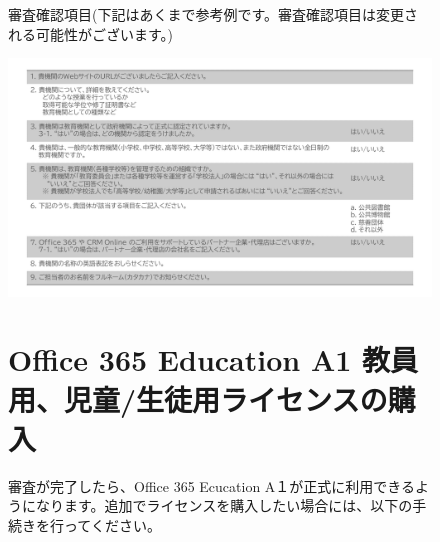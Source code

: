 \begin{figure}[h]
    \begin{minipage}{1.0\textwidth}
        審査確認項目(下記はあくまで参考例です。審査確認項目は変更される可能性がございます。)
    \end{minipage}
\end{figure}


\begin{figure}[h]
    \centering
    \includegraphics[width=17cm]{figures/O365A1_review01.png}
    \vspace{5cm}
\end{figure}

\begin{figure}[h]
    \begin{minipage}{1.0\textwidth}
        \section{Office 365 Education A1 教員用、児童/生徒用ライセンスの購入}
        \label{sec:Office365ライセンス購入}
        審査が完了したら、Office 365 Ecucation A１が正式に利用できるようになります。追加でライセンスを購入したい場合には、以下の手続きを行ってください。
    \end{minipage}
\end{figure}

